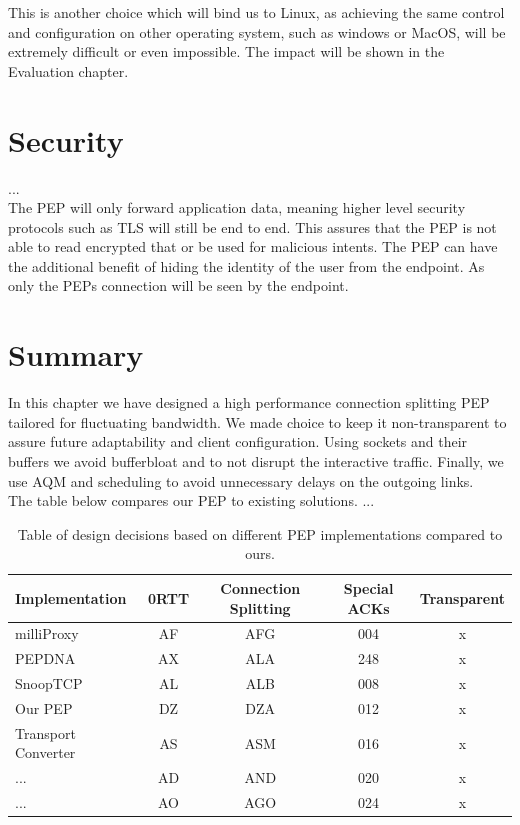 \documentclass[a4paper,english, 11pt]{report}
\begin{document}
This is another choice which will bind us to Linux, as achieving the same control and configuration on other operating system, such as windows or MacOS, will be extremely difficult or even impossible. The impact will be shown in the Evaluation chapter.

\section{Security}
...\\
The PEP will only forward application data, meaning higher level security protocols such as TLS will still be end to end. This assures that the PEP is not able to read encrypted that or be used for malicious intents. The PEP can have the additional benefit of hiding the identity of the user from the endpoint. As only the PEPs connection will be seen by the endpoint.

\section{Summary}
In this chapter we have designed a high performance connection splitting PEP tailored for fluctuating bandwidth. We made choice to keep it non-transparent to assure future adaptability and client configuration. Using sockets and their buffers we avoid bufferbloat and to not disrupt the interactive traffic. Finally, we use AQM and scheduling to avoid unnecessary delays on the outgoing links.\\

The table below compares our PEP to existing solutions. ...\\

\begin{table}[h!]
\centering
\begin{tabularx}{\linewidth}{lCCCC}
\toprule
Implementation & 0RTT & Connection Splitting & Special ACKs & Transparent \\
\midrule
milliProxy & AF & AFG & 004 & x \\
PEPDNA & AX & ALA & 248 & x \\
SnoopTCP & AL & ALB & 008 & x \\
Our PEP & DZ & DZA & 012 & x \\
Transport Converter & AS & ASM & 016 & x \\
... & AD & AND & 020 & x \\
... & AO & AGO & 024 & x \\
\bottomrule
\end{tabularx}
\caption{Table of design decisions based on different PEP implementations compared to ours.}
\end{table}
\end{document}

